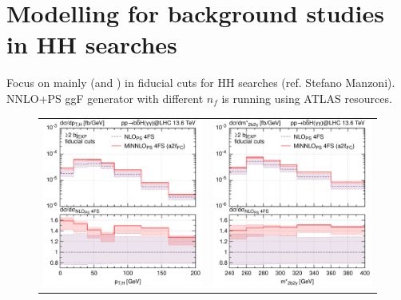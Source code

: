 \documentclass[11pt,a4paper]{article}
\begin{document}
\section{Modelling \bbH{} for background studies in HH searches}
Focus on  mainly (and ) in fiducial cuts for HH searches (ref. Stefano Manzoni). NNLO+PS ggF generator with different $n_f$ is running using ATLAS resources.
\begin{figure}[t!]
\begin{center}
\begin{tabular}{cc}
\includegraphics[width=.45\textwidth, page=1]{plots/4fs/pt_Higgs-EXP-fid-FC.pdf}&
\includegraphics[width=.45\textwidth, page=1]{plots/4fs/mass_2b2gam-EXP-fid-FC.pdf}
\end{tabular}
\vspace*{1ex}
\caption{\label{fig:4fsC}}
\end{center}
\end{figure}
\end{document}
